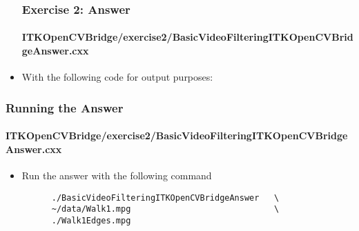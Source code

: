 \begin{frame}
\begin{itemize}
\frametitle{Exercise 2: Answer}
\framesubtitle{ITKOpenCVBridge/exercise2/BasicVideoFilteringITKOpenCVBridgeAnswer.cxx}
\item With the following code for output purposes:
\end{itemize}
\end{frame}

\begin{frame}[fragile]
\frametitle{Running the Answer}
\framesubtitle{ITKOpenCVBridge/exercise2/BasicVideoFilteringITKOpenCVBridgeAnswer.cxx}
\begin{itemize}
\item Run the answer with the following command
\begin{verbatim}
      ./BasicVideoFilteringITKOpenCVBridgeAnswer   \
      ~/data/Walk1.mpg                             \
      ./Walk1Edges.mpg
\end{verbatim}
\end{itemize}
\end{frame}